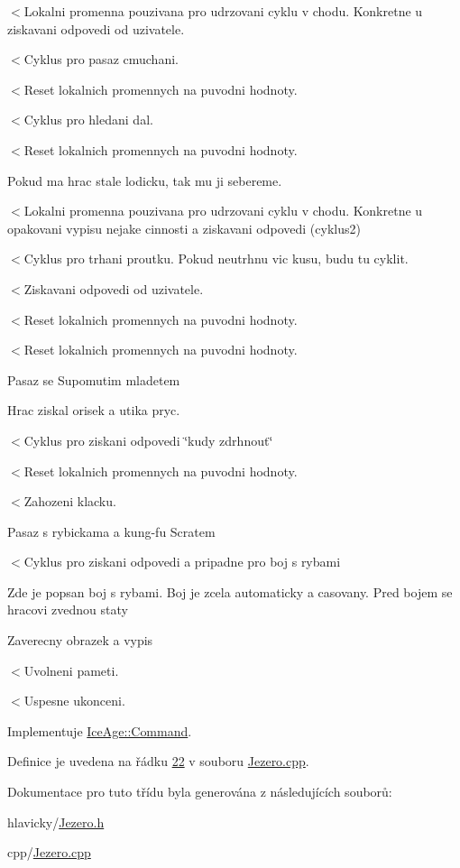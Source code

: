 $<$Lokalni promenna pouzivana pro udrzovani cyklu v chodu. Konkretne u ziskavani odpovedi od uzivatele.

$<$Cyklus pro pasaz cmuchani.

$<$Reset lokalnich promennych na puvodni hodnoty.

$<$Cyklus pro hledani dal.

$<$Reset lokalnich promennych na puvodni hodnoty.

Pokud ma hrac stale lodicku, tak mu ji sebereme.

$<$Lokalni promenna pouzivana pro udrzovani cyklu v chodu. Konkretne u opakovani vypisu nejake cinnosti a ziskavani odpovedi (cyklus2)

$<$Cyklus pro trhani proutku. Pokud neutrhnu vic kusu, budu tu cyklit.

$<$Ziskavani odpovedi od uzivatele.

$<$Reset lokalnich promennych na puvodni hodnoty.

$<$Reset lokalnich promennych na puvodni hodnoty.

Pasaz se Supomutim mladetem

Hrac ziskal orisek a utika pryc.

$<$Cyklus pro ziskani odpovedi \char`\"{}kudy zdrhnout\char`\"{}

$<$Reset lokalnich promennych na puvodni hodnoty.

$<$Zahozeni klacku.

Pasaz s rybickama a kung-\/fu Scratem

$<$Cyklus pro ziskani odpovedi a pripadne pro boj s rybami

Zde je popsan boj s rybami. Boj je zcela automaticky a casovany. Pred bojem se hracovi zvednou staty

Zaverecny obrazek a vypis

$<$Uvolneni pameti.

$<$Uspesne ukonceni. 

Implementuje \hyperlink{classIceAge_1_1Command_a0466e88c0c9e2a44618c12f6c88b76fe}{Ice\+Age\+::\+Command}.



Definice je uvedena na řádku \hyperlink{Jezero_8cpp_source_l00022}{22} v souboru \hyperlink{Jezero_8cpp_source}{Jezero.\+cpp}.



Dokumentace pro tuto třídu byla generována z následujících souborů\+:\begin{DoxyCompactItemize}
\item 
hlavicky/\hyperlink{Jezero_8h}{Jezero.\+h}\item 
cpp/\hyperlink{Jezero_8cpp}{Jezero.\+cpp}\end{DoxyCompactItemize}
